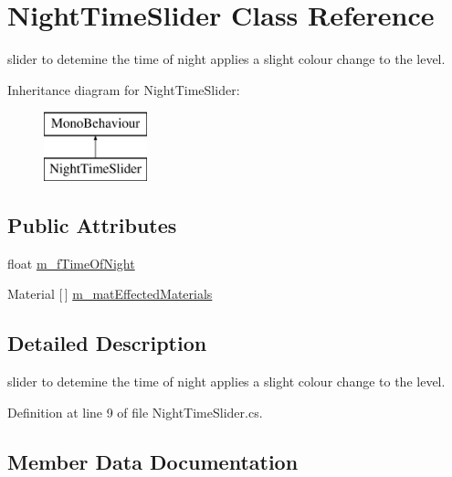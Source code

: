 \hypertarget{class_night_time_slider}{}\section{Night\+Time\+Slider Class Reference}
\label{class_night_time_slider}


slider to detemine the time of night applies a slight colour change to the level.  


Inheritance diagram for Night\+Time\+Slider\+:\begin{figure}[H]
\begin{center}
\leavevmode
\includegraphics[height=2.000000cm]{class_night_time_slider}
\end{center}
\end{figure}
\subsection*{Public Attributes}
\begin{DoxyCompactItemize}
\item 
float \mbox{\hyperlink{class_night_time_slider_a2a5457f52b566901154857da2eb59c36}{m\+\_\+f\+Time\+Of\+Night}}
\item 
Material \mbox{[}$\,$\mbox{]} \mbox{\hyperlink{class_night_time_slider_af42bb88d5354f004f2d79547bc6bdd4b}{m\+\_\+mat\+Effected\+Materials}}
\end{DoxyCompactItemize}


\subsection{Detailed Description}
slider to detemine the time of night applies a slight colour change to the level. 



Definition at line 9 of file Night\+Time\+Slider.\+cs.



\subsection{Member Data Documentation}
\mbox{\label{class_night_time_slider_a2a5457f52b566901154857da2eb59c36}} 
